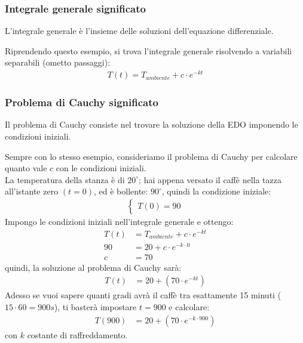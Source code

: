 \documentclass{article}  %
\begin{document}
\subsubsection{Integrale generale significato}
L'integrale generale è l'insieme delle soluzioni dell'equazione differenziale.
\begin{esempio}
	Riprendendo questo esempio, si trova l'integrale generale risolvendo a variabili separabili (ometto passaggi):
	\begin{align*}
		T(t)=T_{ambiente}+c \cdot e^{-kt}
	\end{align*}
\end{esempio}

\subsubsection{Problema di Cauchy significato}
Il problema di Cauchy consiste nel trovare la soluzione della EDO imponendo le condizioni iniziali.
\begin{esempio}
	Sempre con lo stesso esempio, consideriamo il problema di Cauchy per calcolare quanto vale $c$ con le condizioni iniziali. \\
	La temperatura della stanza è di $20^{\circ}$; hai appena versato il caffè nella tazza all'istante zero $(t=0)$, ed è bollente: $90^{\circ}$, quindi la condizione iniziale:
	\begin{align*}
		\begin{cases}
			T(0)=90
		\end{cases}
	\end{align*}
	Impongo le condizioni iniziali nell'integrale generale e ottengo:
	\begin{align*}
		T(t) & = T_{ambiente}+c \cdot e^{-kt} \\
		90   & = 20 + c \cdot e^{-k \cdot 0}  \\
		c    & = 70
	\end{align*}
	quindi, la soluzione al problema di Cauchy sarà:
	\begin{align*}
		T(t) & = 20 + (70 \cdot e^{-kt})
	\end{align*}
	Adesso se vuoi sapere quanti gradi avrà il caffè tra esattamente 15 minuti ($15 \cdot 60 = 900 s$), ti basterà impostare $t=900$ e calcolare:
	\begin{align*}
		T(900) & = 20 + (70 \cdot e^{-k \cdot 900})
	\end{align*}
	con $k$ costante di raffreddamento.
\end{esempio}
\end{document}
